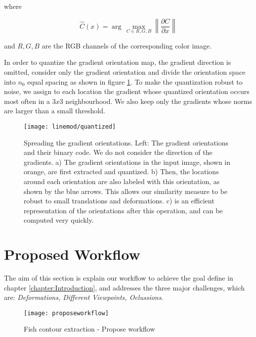 where

\begin{equation}
\hat{C}(x)=\arg \, \max\limits_{C \in {R,G,B}}\left\|\frac{\partial C}{\partial x}\right\|
\end{equation}

and $R,G,B$ are the RGB channels of the corresponding color image.

In order to quantize the gradient orientation map, the gradient direction is omitted,
consider only the gradient orientation and divide the orientation space into $n_0$
equal spacing as shown in figure \ref{fig:quatized}. To make the quantization robust to 
noise, we assign to each location the gradient whose quantized orientation occurs most often in a $3 x 3$
neighbourhood. We also keep only the gradients whose norms are larger than a small
threshold.

\begin{figure}[ht]
\centering
\texttt{[image: linemod/quantized]}
\caption{Spreading the gradient orientations. Left: The gradient orientations and their binary code. We do not consider the direction of the gradients. a) The gradient orientations in the input image, shown in orange, are first extracted and quantized. b) Then, the locations around each orientation are also labeled with this orientation, as shown by the blue
arrows. This allows our similarity measure to be robust to small translations and deformations. c) is an efficient representation of the orientations after this operation, and can be computed very quickly.}
\label{fig:quatized}
\end{figure}

\section{Proposed Workflow}
\label{sec:proposeworkflow}
The aim of this section is explain our workflow to achieve the goal define in 
chapter \ref{chapter:Introduction}, and addresses the three major challenges, which are:
\textit{Deformations, Different Viewpoints, Oclussions}.

\begin{figure}[ht]
\begin{adjustwidth}{-1in}{-1in}
\centering
\texttt{[image: proposeworkflow]}
\caption{Fish contour extraction - Propose workflow}
\label{fig:Proposeworkflow}
\end{adjustwidth}
\end{figure}

